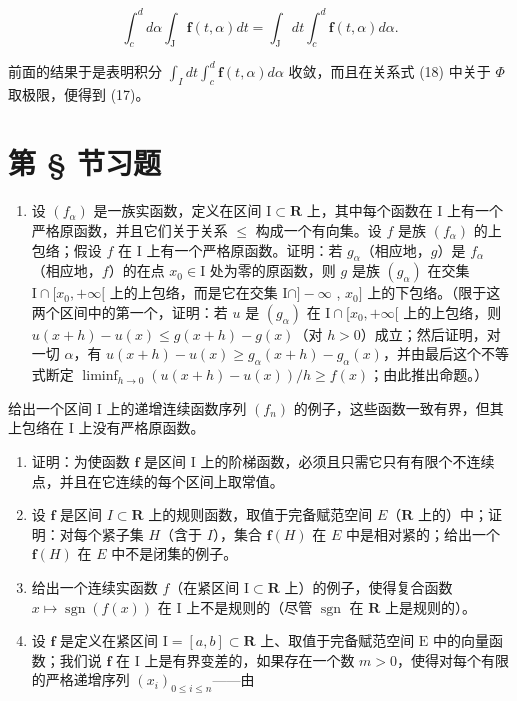 \[
\int_ {c} ^ {d} d \alpha \int_ {\mathrm{J}} \mathbf {f} (t, \alpha) d t = \int_ {\mathrm{J}} d t \int_ {c} ^ {d} \mathbf {f} (t, \alpha) d \alpha .\tag{18}
\]

前面的结果于是表明积分 \(\int_{I} dt \int_{c}^{d} \mathbf{f}(t, \alpha) d\alpha\) 收敛，而且在关系式 (18) 中关于 \(\Phi\) 取极限，便得到 (17)。

\setcounter{exercisegroup}{0}
\section*{第 \S{} 节习题}
{}

\begin{enumerate}
\def\labelenumi{\arabic{enumi})}
\tightlist
\item
  设 \((f_{\alpha})\) 是一族实函数，定义在区间 \(\mathrm{I} \subset \mathbf{R}\) 上，其中每个函数在 \(\mathrm{I}\) 上有一个严格原函数，并且它们关于关系 \(\leqslant\) 构成一个有向集。设 \(f\) 是族 \((f_{\alpha})\) 的上包络；假设 \(f\) 在 \(\mathrm{I}\) 上有一个严格原函数。证明：若 \(g_{\alpha}\)（相应地，\(g\)）是 \(f_{\alpha}\)（相应地，\(f\)）的在点 \(x_0 \in \mathrm{I}\) 处为零的原函数，则 \(g\) 是族 \((g_{\alpha})\) 在交集 \(\mathrm{I} \cap [x_0, +\infty[\) 上的上包络，而是它在交集 \(\mathrm{I} \cap ] - \infty\) , \(x_0]\) 上的下包络。（限于这两个区间中的第一个，证明：若 \(u\) 是 \((g_{\alpha})\) 在 \(\mathrm{I} \cap [x_0, +\infty[\) 上的上包络，则 \(u(x + h) - u(x) \leqslant g(x + h) - g(x)\)（对 \(h > 0\)）成立；然后证明，对一切 \(\alpha\)，有 \(u(x + h) - u(x) \geqslant g_{\alpha}(x + h) - g_{\alpha}(x)\)，并由最后这个不等式断定 \(\liminf_{h \to 0} (u(x + h) - u(x))/h \geqslant f(x)\)；由此推出命题。）
\end{enumerate}

给出一个区间 I 上的递增连续函数序列 \((f_n)\) 的例子，这些函数一致有界，但其上包络在 I 上没有严格原函数。

\begin{enumerate}
\def\labelenumi{\arabic{enumi})}
\setcounter{enumi}{1}
\item
  证明：为使函数 \(\mathbf{f}\) 是区间 I 上的阶梯函数，必须且只需它只有有限个不连续点，并且在它连续的每个区间上取常值。
\item
  设 \(\mathbf{f}\) 是区间 \(I \subset \mathbf{R}\) 上的规则函数，取值于完备赋范空间 \(E\)（\(\mathbf{R}\) 上的）中；证明：对每个紧子集 \(H\)（含于 \(I\)），集合 \(\mathbf{f}(H)\) 在 \(E\) 中是相对紧的；给出一个 \(\mathbf{f}(H)\) 在 \(E\) 中不是闭集的例子。
\item
  给出一个连续实函数 \(f\)（在紧区间 \(\mathrm{I} \subset \mathbf{R}\) 上）的例子，使得复合函数 \(x \mapsto \operatorname{sgn}(f(x))\) 在 \(\mathrm{I}\) 上不是规则的（尽管 \(\operatorname{sgn}\) 在 \(\mathbf{R}\) 上是规则的）。
\item
  设 \(\mathbf{f}\) 是定义在紧区间 \(\mathrm{I} = [a, b] \subset \mathbf{R}\) 上、取值于完备赋范空间 \(\mathrm{E}\) 中的向量函数；我们说 \(\mathbf{f}\) 在 \(\mathrm{I}\) 上是有界变差的，如果存在一个数 \(m > 0\)，使得对每个有限的严格递增序列 \((x_i)_{0 \leqslant i \leqslant n}\)——由
\end{enumerate}

